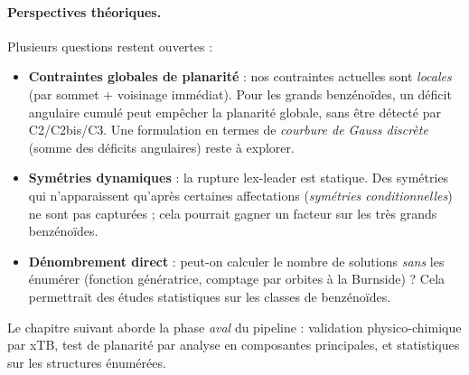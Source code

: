 \documentclass[12pt,a4paper]{article}
\theoremstyle{definition}
\theoremstyle{remark}
\begin{document}
\paragraph{Perspectives th\'eoriques.}
Plusieurs questions restent ouvertes :
\begin{itemize}
  \item \textbf{Contraintes globales de planarit\'e} : nos contraintes
        actuelles sont \emph{locales} (par sommet + voisinage imm\'ediat).
        Pour les grands benz\'eno\"ides, un \og d\'eficit angulaire
        cumul\'e \fg{} peut emp\^echer la planarit\'e globale, sans
        \^etre d\'etect\'e par C2/C2bis/C3. Une formulation en termes
        de \emph{courbure de Gauss discr\`ete} (somme des d\'eficits
        angulaires) reste \`a explorer.
  \item \textbf{Sym\'etries dynamiques} : la rupture lex-leader est
        statique. Des sym\'etries qui n'apparaissent qu'apr\`es certaines
        affectations (\emph{sym\'etries conditionnelles}) ne sont pas
        captur\'ees ; cela pourrait gagner un facteur sur les tr\`es
        grands benz\'eno\"ides.
  \item \textbf{D\'enombrement direct} : peut-on calculer le nombre
        de solutions \emph{sans} les \'enum\'erer (fonction
        g\'en\'eratrice, comptage par orbites \`a la Burnside) ? Cela
        permettrait des \'etudes statistiques sur les classes de
        benz\'eno\"ides.
\end{itemize}

Le chapitre suivant aborde la phase \emph{aval} du pipeline : validation
physico-chimique par xTB, test de planarit\'e par analyse en composantes
principales, et statistiques sur les structures \'enum\'er\'ees.
\end{document}
